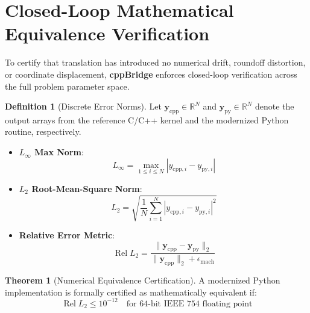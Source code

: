\documentclass[11pt,a4paper]{article}
\theoremstyle{definition}
\newtheorem{definition}{Definition}[section]
\newtheorem{theorem}{Theorem}[section]
\begin{document}
\section{Closed-Loop Mathematical Equivalence Verification}

To certify that translation has introduced no numerical drift, roundoff distortion, or coordinate displacement, \textbf{cppBridge} enforces closed-loop verification across the full problem parameter space.

\begin{definition}[Discrete Error Norms]
Let $\mathbf{y}_{\mathrm{cpp}} \in \mathbb{R}^N$ and $\mathbf{y}_{\mathrm{py}} \in \mathbb{R}^N$ denote the output arrays from the reference C/C++ kernel and the modernized Python routine, respectively.
\begin{itemize}
    \item \textbf{$L_\infty$ Max Norm}:
    \begin{equation}
        L_\infty = \max_{1 \le i \le N} |y_{\mathrm{cpp}, i} - y_{\mathrm{py}, i}|
    \end{equation}
    \item \textbf{$L_2$ Root-Mean-Square Norm}:
    \begin{equation}
        L_2 = \sqrt{\frac{1}{N} \sum_{i=1}^N |y_{\mathrm{cpp}, i} - y_{\mathrm{py}, i}|^2}
    \end{equation}
    \item \textbf{Relative Error Metric}:
    \begin{equation}
        \operatorname{Rel } L_2 = \frac{\|\mathbf{y}_{\mathrm{cpp}} - \mathbf{y}_{\mathrm{py}}\|_2}{\|\mathbf{y}_{\mathrm{cpp}}\|_2 + \epsilon_{\mathrm{mach}}}
    \end{equation}
\end{itemize}
\end{definition}

\begin{theorem}[Numerical Equivalence Certification]
A modernized Python implementation is formally certified as mathematically equivalent if:
\begin{equation}
    \operatorname{Rel } L_2 \le 10^{-12} \quad \text{for 64-bit IEEE 754 floating point}
\end{equation}
\end{theorem}

\end{document}
